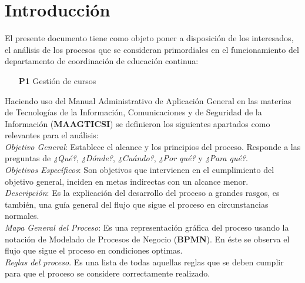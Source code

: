 \newpage
\section{Introducción}

    

   	
\begin{footnotesize}	
	El presente documento tiene como objeto poner a disposición de los interesados, el análisis de los procesos que se consideran primordiales en el funcionamiento del departamento de coordinación de educación continua:
\begin{itemize}
	\item[\textbf{P1}] Gestión de cursos
\end{itemize}
\vspace{1cm}
Haciendo uso del  Manual Administrativo de Aplicación General en las materias de Tecnologías de la Información, Comunicaciones y de Seguridad de la Información (\textbf{MAAGTICSI})  se definieron los siguientes apartados como relevantes para el análisis:\\

\textit{Objetivo General}: Establece el alcance y los principios del proceso. Responde a las preguntas de \textit{¿Qué?}, \textit{¿Dónde?}, \textit{¿Cuándo?}, \textit{¿Por qué?} y \textit{¿Para qué?}.\\

\textit{Objetivos Específicos}: Son objetivos que intervienen en el cumplimiento del objetivo general, inciden en metas indirectas con un alcance menor.\\

\textit{Descripción}: Es la explicación del desarrollo del proceso a grandes rasgos, es también, una guía general del flujo que sigue el proceso en circunstancias normales.\\

\textit{Mapa General del Proceso}: Es una representación gráfica del proceso usando la notación de Modelado de Procesos de Negocio (\textbf{BPMN}). En éste se observa el flujo que sigue el proceso en condiciones optimas.\\

\textit{Reglas del proceso}. Es una lista de todas aquellas reglas que se deben cumplir para que el proceso se considere correctamente realizado.\\


\end{footnotesize}
